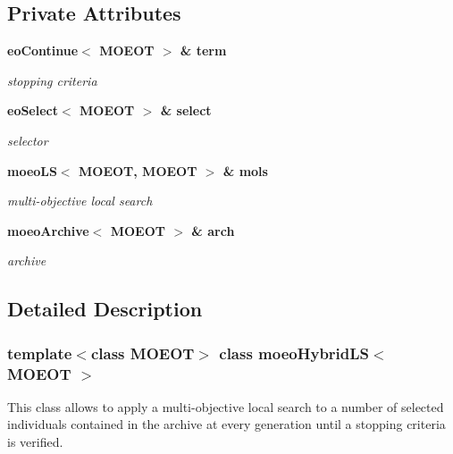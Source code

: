 \subsection*{Private Attributes}
\begin{CompactItemize}
\item 
\bf{eo\-Continue}$<$ MOEOT $>$ \& \bf{term}\label{classmoeoHybridLS_776a00e2e8970ad6e3940c61eabd52ba}

\begin{CompactList}\small\item\em stopping criteria \item\end{CompactList}\item 
\bf{eo\-Select}$<$ MOEOT $>$ \& \bf{select}\label{classmoeoHybridLS_106ca80830d807da0cfdcac934737533}

\begin{CompactList}\small\item\em selector \item\end{CompactList}\item 
\bf{moeo\-LS}$<$ MOEOT, MOEOT $>$ \& \bf{mols}\label{classmoeoHybridLS_28af163ec90dbff609b38666b249a19c}

\begin{CompactList}\small\item\em multi-objective local search \item\end{CompactList}\item 
\bf{moeo\-Archive}$<$ MOEOT $>$ \& \bf{arch}\label{classmoeoHybridLS_4cda70ac38a51d7b629a1fed56af4c33}

\begin{CompactList}\small\item\em archive \item\end{CompactList}\end{CompactItemize}


\subsection{Detailed Description}
\subsubsection*{template$<$class MOEOT$>$ class moeo\-Hybrid\-LS$<$ MOEOT $>$}

This class allows to apply a multi-objective local search to a number of selected individuals contained in the archive at every generation until a stopping criteria is verified. 



